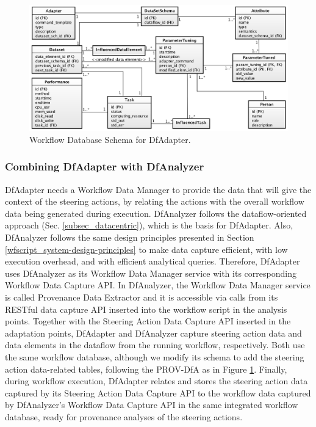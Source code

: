 \begin{figure}[H]
    \centering
    \includegraphics[width=\textwidth,keepaspectratio]{img/DB-Schema-ParameterTuning.png}
    \caption{Workflow Database Schema for DfAdapter.}
    \label{fig:dfadapter_wfdbschema}
\end{figure}

\subsubsection{Combining DfAdapter with DfAnalyzer}


DfAdapter needs a Workflow Data Manager to provide the
data that will give the context of the steering actions, by relating the actions with the overall workflow data being generated during execution.
DfAnalyzer \cite{Silva2017Raw,Camata2018In,silva_dfanalyzer:_2018} follows the dataflow-oriented approach (Sec. \ref{subsec_datacentric}), which is the basis for DfAdapter.
Also, DfAnalyzer follows the same design principles presented in Section \ref{wfscript_system-design-principles} to make data capture efficient, with low execution overhead, and with efficient analytical queries.
Therefore, DfAdapter uses DfAnalyzer as its Workflow Data Manager service with its corresponding Workflow Data Capture API.
In DfAnalyzer, the Workflow Data Manager service is called Provenance Data Extractor and it is accessible via calls from its RESTful data capture API inserted into the workflow script in the analysis points.
Together with the Steering Action Data Capture API inserted in the adaptation points, DfAdapter and DfAnalyzer capture steering action data and data elements in the dataflow from the running workflow, respectively.
Both use the same workflow database, although we modify its schema to add the steering action data-related tables, following the PROV-DfA as in Figure \ref{fig:dfadapter_wfdbschema}.
Finally, during workflow execution, DfAdapter relates and stores the steering action data captured by its Steering Action Data Capture API to the workflow data captured by DfAnalyzer's Workflow Data Capture API in the same integrated workflow database, ready for provenance analyses of the steering actions.


